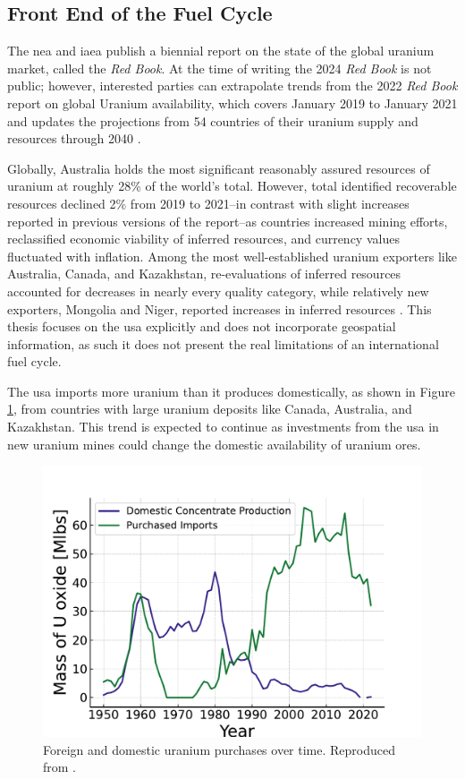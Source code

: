 \subsection{Front End of the Fuel Cycle}
\label{sec:front_end}
The \gls{nea} and \gls{iaea} publish a biennial report on the state of the global uranium market, called the \textit{Red Book}. At the time of writing the 2024 \textit{Red Book} is not public; however, interested parties can extrapolate trends from the 2022 \textit{Red Book} report on global Uranium availability, which covers January 2019 to January 2021 and updates the projections from 54 countries of their uranium supply and resources through 2040 \cite{nea_red_book_2022}.

Globally, Australia holds the most significant reasonably assured resources
of uranium at roughly 28\% of the world's total. However, total identified recoverable resources declined 2\% from 2019 to 2021--in contrast with slight increases reported in previous versions of the report--as countries increased mining efforts, reclassified economic viability of inferred resources, and currency values fluctuated with inflation. Among the most well-established uranium exporters like Australia, Canada, and Kazakhstan, re-evaluations of inferred resources accounted for decreases in nearly every quality category, while relatively new exporters, Mongolia and Niger, reported increases in inferred resources \cite{nea_red_book_2022}. This thesis focuses on the \gls{usa} explicitly and does not incorporate geospatial information, as such it does not present the real limitations of an international fuel cycle.

The \gls{usa} imports more uranium than it produces domestically, as shown in Figure \ref{fig:foregin_u3o8}, from countries with large uranium deposits like Canada, Australia, and Kazakhstan. This trend is expected to continue as investments from the \gls{usa} in new uranium mines could change the domestic availability of uranium ores.

\begin{figure}[H]
   \centering
   \includegraphics[scale=0.7]{images/intro/uranium_production_imports.pdf}
   \caption{Foreign and domestic uranium purchases over time. Reproduced from \cite{eia_monthly_energy_review_2024}.}
   \label{fig:foregin_u3o8}
\end{figure}

